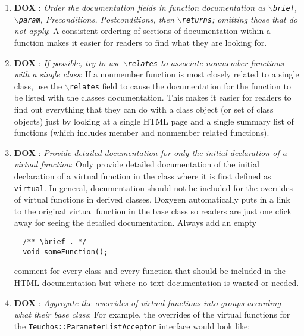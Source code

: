 \begin{enumerate}
{}\item{}\textbf{DOX }:
{}\textit{Order the documentation fields in function documentation as
{}\texttt{$\backslash$brief}, {}\texttt{$\backslash$param}, Preconditions,
Postconditions, then {}\texttt{$\backslash$returns}; omitting those that do
not apply}: A consistent ordering of sections of documentation within a
function makes it easier for readers to find what they are looking for.

{}\item{}\textbf{DOX }:
{}\textit{If possible, try to use {}\texttt{$\backslash$relates} to
associate nonmember functions with a single class}: If a nonmember function
is most closely related to a single class, use the
{}\texttt{$\backslash$relates} field to cause the documentation for the
function to be listed with the classes documentation.  This makes it easier
for readers to find out everything that they can do with a class object (or
set of class objects) just by looking at a single HTML page and a single
summary list of functions (which includes member and nonmember related
functions).

{}\item{}\textbf{DOX }:
{}\textit{Provide detailed documentation for only the initial declaration
of a virtual function}: Only provide detailed documentation of the initial
declaration of a virtual function in the class where it is first defined as
{}\texttt{virtual}.  In general, documentation should not be included for the
overrides of virtual functions in derived classes.  Doxygen automatically puts
in a link to the original virtual function in the base class so readers are
just one click away for seeing the detailed documentation.  Always add an
empty
%
{\small\begin{verbatim}
  /** \brief . */
  void someFunction();
\end{verbatim}}
%
comment for every class and every function that should be included in the HTML
documentation but where no text documentation is wanted or needed.

{}\item{}\textbf{DOX }:
{}\textit{Aggregate the overrides of virtual functions into groups
according what their base class}: For example, the overrides of the virtual
functions for the {}\texttt{Teuchos\-::Parameter\-List\-Acceptor} interface
would look like:


\end{enumerate}
